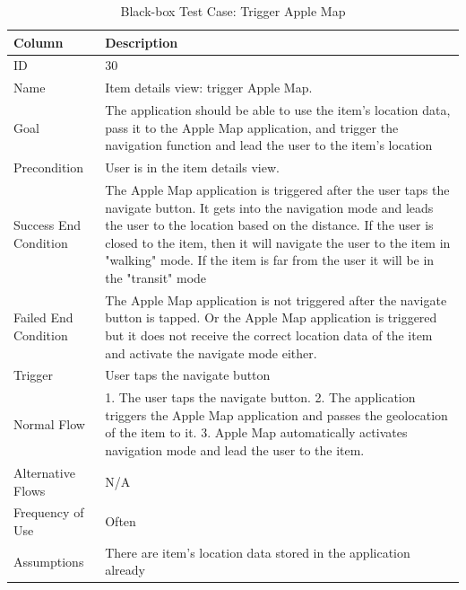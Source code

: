 \documentclass[12pt,a4paper]{article}
\begin{document}
          \begin{table}[H]
            \centering
              \begin{tabularx}{\textwidth}{l X}
                \hline
                Column & Description  \\ \hline
                ID & 30 \\
                Name &  Item details view: trigger Apple Map. \\
                Goal &  The application should be able to use the item's location data, pass it to the Apple Map application, and trigger the navigation function and lead the user to the item's location       \\
                Precondition & User is in the item details view.        \\
                Success End Condition & The Apple Map application is triggered after the user taps the navigate button. It gets into the navigation mode and leads the user to the location based on the distance. If the user is closed to the item, then it will navigate the user to the item in "walking" mode. If the item is far from the user it will be in the "transit" mode         \\
                Failed End Condition & The Apple Map application is not triggered after the navigate button is tapped. Or the Apple Map application is triggered but it does not receive the correct location data of the item and activate the navigate mode either.           \\
                Trigger & User taps the navigate button \\
                Normal Flow & 1. The user taps the navigate button. 2. The application triggers the Apple Map application and passes the geolocation of the item to it. 3. Apple Map automatically activates navigation mode and lead the user to the item. \\
                Alternative Flows & N/A \\
                Frequency of Use & Often \\
                Assumptions & There are item's location data stored in the application already \\
                \hline
              \end{tabularx}
              \caption[Table caption text]{Black-box Test Case: Trigger Apple Map}
              \label{table:Black-box Test Case: Trigger Apple Map}
          \end{table}
\end{document}
